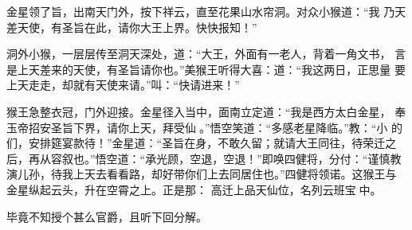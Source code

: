 金星领了旨，出南天门外，按下祥云，直至花果山水帘洞。对众小猴道：“我
乃天差天使，有圣旨在此，请你大王上界。快快报知！”

洞外小猴，一层层传至洞天深处，道：“大王，外面有一老人，背着一角文书，
言是上天差来的天使，有圣旨请你也。”美猴王听得大喜：道：“我这两日，正思量
要上天走走，却就有天使来请。”叫：“快请进来！”

猴王急整衣冠，门外迎接。金星径入当中，面南立定道：“我是西方太白金星，
奉玉帝招安圣旨下界，请你上天，拜受仙。”悟空笑道：“多感老星降临。”教：“小
的们，安排筵宴款待！”金星道：“圣旨在身，不敢久留；就请大王同往，待荣迁之
后，再从容叙也。”悟空道：“承光顾，空退，空退！”即唤四健将，分付：“谨慎教
演儿孙，待我上天去看看路，却好带你们上去同居住也。”四健将领诺。这猴王与
金星纵起云头，升在空霄之上。正是那：
高迁上品天仙位，名列云班宝中。

毕竟不知授个甚么官爵，且听下回分解。